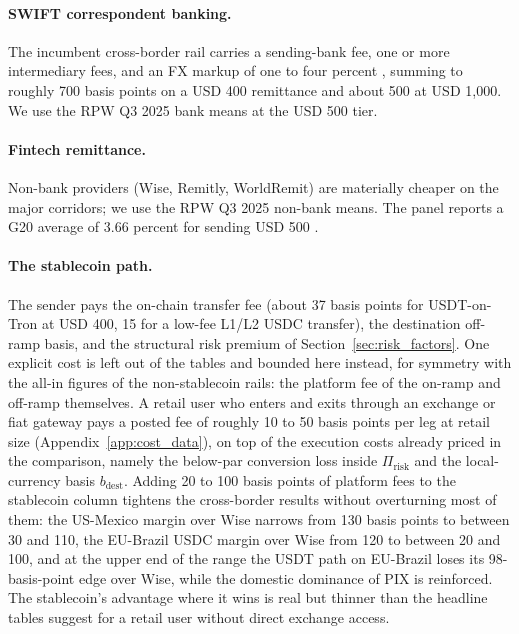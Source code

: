 \paragraph{SWIFT correspondent banking.} The incumbent cross-border rail carries a sending-bank fee, one or more intermediary fees, and an FX markup of one to four percent \citep{cpmi_2018_cross_border_retail}, summing to roughly 700 basis points on a USD 400 remittance and about 500 at USD 1{,}000. We use the RPW Q3 2025 bank means at the USD 500 tier.

\paragraph{Fintech remittance.} Non-bank providers (Wise, Remitly, WorldRemit) are materially cheaper on the major corridors; we use the RPW Q3 2025 non-bank means. The panel reports a G20 average of 3.66 percent for sending USD 500 \citep{rpw_q3_2025}.

\paragraph{The stablecoin path.} The sender pays the on-chain transfer fee (about 37 basis points for USDT-on-Tron at USD 400, 15 for a low-fee L1/L2 USDC transfer), the destination off-ramp basis, and the structural risk premium of Section~\ref{sec:risk_factors}. One explicit cost is left out of the tables and bounded here instead, for symmetry with the all-in figures of the non-stablecoin rails: the platform fee of the on-ramp and off-ramp themselves. A retail user who enters and exits through an exchange or fiat gateway pays a posted fee of roughly 10 to 50 basis points per leg at retail size (Appendix~\ref{app:cost_data}), on top of the execution costs already priced in the comparison, namely the below-par conversion loss inside $\Pi_{\text{risk}}$ and the local-currency basis $b_{\text{dest}}$. Adding 20 to 100 basis points of platform fees to the stablecoin column tightens the cross-border results without overturning most of them: the US-Mexico margin over Wise narrows from 130 basis points to between 30 and 110, the EU-Brazil USDC margin over Wise from 120 to between 20 and 100, and at the upper end of the range the USDT path on EU-Brazil loses its 98-basis-point edge over Wise, while the domestic dominance of PIX is reinforced. The stablecoin's advantage where it wins is real but thinner than the headline tables suggest for a retail user without direct exchange access.

